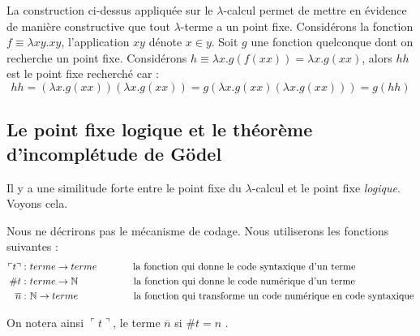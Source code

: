 La construction ci-dessus appliquée sur le $\lambda$-calcul permet de mettre en évidence de 
manière constructive que tout $\lambda$-terme a un point fixe.
Considérons la fonction $f \equiv \lambda xy.xy$, l'application $xy$ dénote $x \in y$.
Soit $g$ une fonction quelconque dont on recherche un point fixe.
Considérons $h\equiv \lambda x.g(f (x x))=\lambda x.g(x x)$, alors $h h$ est 
le point fixe recherché car :
$$
hh=(\lambda x.g(xx))(\lambda x.g(xx))=g(\lambda x.g(xx)(\lambda x.g(xx)))=g(hh)
$$

\subsection{Le point fixe logique et le théorème d'incomplétude de Gödel} %
Il y a une similitude forte entre le point fixe du $\lambda$-calcul et le point fixe \textit{logique}. Voyons cela.

Nous ne décrirons pas le mécanisme de codage. 
Nous utiliserons les fonctions suivantes :
\begin{align*}
\ulcorner t  \urcorner :& \  terme \rightarrow terme \hspace{1.3cm} \text{la fonction qui donne le code syntaxique d'un terme}\\
\#  t :& \  terme \rightarrow \mathbb{N} \hspace{2cm} \text{la fonction qui donne le code numérique d'un terme}\\
\overline{  n } :& \  \mathbb{N} \rightarrow terme \hspace{2cm}  \text{la fonction qui transforme un code numérique
 en code syntaxique}
\end{align*}

On notera ainsi $\ulcorner t \urcorner$, le terme $\overline{n}$  si 
$\# t =n$ . 


